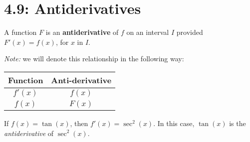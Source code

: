 \documentclass[answers]{exam}
\begin{document}
\section{4.9: Antiderivatives}
  \begin{defn*}[Antiderivative]
    A function $F$ is an \textbf{antiderivative} of $f$ on an interval $I$ provided $F'(x)=f(x)$, for $x$ in $I$.
  \end{defn*}
  \begin{center}
    \textit{Note:} we will denote this relationship in the following way:
    
    \begin{tabular}{@{}cc@{}}\toprule
      Function& Anti-derivative\\\midrule
      $f'(x)$& $f(x)$\\
      $f(x)$& $F(x)$\\\bottomrule
    \end{tabular}
  \end{center}
  
  \begin{ex*}
    If $f(x)=\tan(x)$, then $f'(x)=\sec^2(x)$. In this case, $\tan(x)$ is the \textit{antiderivative} of $\sec^2(x)$.
  \end{ex*}
  
  \noindent
  
\end{document}
